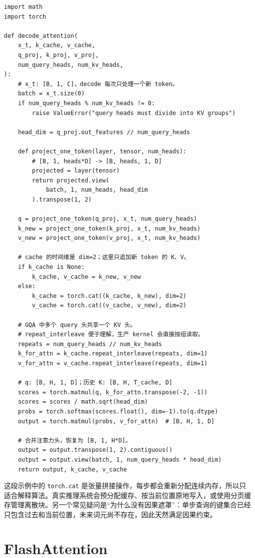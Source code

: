 \begin{lstlisting}
import math
import torch

def decode_attention(
    x_t, k_cache, v_cache,
    q_proj, k_proj, v_proj,
    num_query_heads, num_kv_heads,
):
    # x_t: [B, 1, C]，decode 每次只处理一个新 token。
    batch = x_t.size(0)
    if num_query_heads % num_kv_heads != 0:
        raise ValueError("query heads must divide into KV groups")

    head_dim = q_proj.out_features // num_query_heads

    def project_one_token(layer, tensor, num_heads):
        # [B, 1, heads*D] -> [B, heads, 1, D]
        projected = layer(tensor)
        return projected.view(
            batch, 1, num_heads, head_dim
        ).transpose(1, 2)

    q = project_one_token(q_proj, x_t, num_query_heads)
    k_new = project_one_token(k_proj, x_t, num_kv_heads)
    v_new = project_one_token(v_proj, x_t, num_kv_heads)

    # cache 的时间维是 dim=2；这里只追加新 token 的 K、V。
    if k_cache is None:
        k_cache, v_cache = k_new, v_new
    else:
        k_cache = torch.cat((k_cache, k_new), dim=2)
        v_cache = torch.cat((v_cache, v_new), dim=2)

    # GQA 中多个 query 头共享一个 KV 头。
    # repeat_interleave 便于理解，生产 kernel 会直接按组读取。
    repeats = num_query_heads // num_kv_heads
    k_for_attn = k_cache.repeat_interleave(repeats, dim=1)
    v_for_attn = v_cache.repeat_interleave(repeats, dim=1)

    # q: [B, H, 1, D]；历史 K: [B, H, T_cache, D]
    scores = torch.matmul(q, k_for_attn.transpose(-2, -1))
    scores = scores / math.sqrt(head_dim)
    probs = torch.softmax(scores.float(), dim=-1).to(q.dtype)
    output = torch.matmul(probs, v_for_attn)  # [B, H, 1, D]

    # 合并注意力头，恢复为 [B, 1, H*D]。
    output = output.transpose(1, 2).contiguous()
    output = output.view(batch, 1, num_query_heads * head_dim)
    return output, k_cache, v_cache
\end{lstlisting}

这段示例中的 \texttt{torch.cat} 是张量拼接操作，每步都会重新分配连续内存，所以只适合解释算法。真实推理系统会预分配缓存、按当前位置原地写入，或使用分页缓存管理离散块。另一个常见疑问是“为什么没有因果遮罩”：单步查询的键集合已经只包含过去和当前位置，未来词元尚不存在，因此天然满足因果约束。

\chapter{FlashAttention}
\label{sec:flash}

